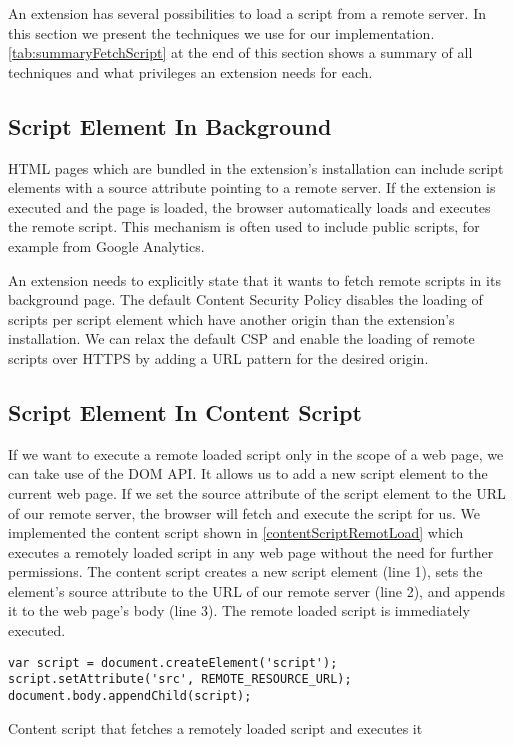 	An extension has several possibilities to load a script from a remote server. In this section we present the techniques we use for our implementation. \autoref{tab:summaryFetchScript} at the end of this section shows a summary of all techniques and what privileges an extension needs for each. 
		
\subsection{Script Element In Background}
	
	HTML pages which are bundled in the extension's installation can include script elements with a source attribute pointing to a remote server. If the extension is executed and the page is loaded, the browser automatically loads and executes the remote script. This mechanism is often used to include public scripts, for example from Google Analytics. 
	
	An extension needs to explicitly state that it wants to fetch remote scripts in its background page. The default Content Security Policy disables the loading of scripts per script element which have another origin than the extension's installation. We can relax the default CSP and enable the loading of remote scripts over HTTPS by adding a URL pattern for the desired origin. 
	
\subsection{Script Element In Content Script}

	If we want to execute a remote loaded script only in the scope of a web page, we can take use of the DOM API. It allows us to add a new script element to the current web page. If we set the source attribute of the script element to the URL of our remote server, the browser will fetch and execute the script for us. We implemented the content script shown in \autoref{contentScriptRemotLoad} which executes a remotely loaded script in any web page without the need for further permissions. The content script creates a new script element (line 1), sets the element's source attribute to the URL of our remote server (line 2), and appends it to the web page's body (line 3). The remote loaded script is immediately executed.
	
	\begin{code}
		\begin{lstlisting}
var script = document.createElement('script');
script.setAttribute('src', REMOTE_RESOURCE_URL);
document.body.appendChild(script);
\end{lstlisting}
		\caption{Content script that fetches a remotely loaded script and executes it}
		\label{contentScriptRemotLoad}
	\end{code}
	
